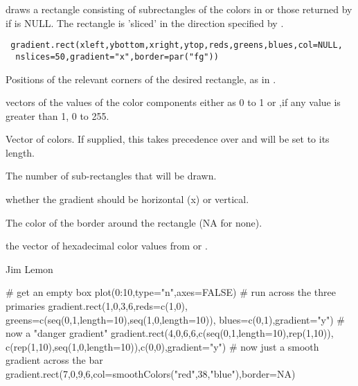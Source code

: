 \begin{Description}\relax
{} draws a rectangle consisting of 
subrectangles of the colors in  or those returned by 
 if  is NULL. The rectangle is
'sliced' in the direction specified by .
\end{Description}
\begin{Usage}
\begin{verbatim}
 gradient.rect(xleft,ybottom,xright,ytop,reds,greens,blues,col=NULL,
  nslices=50,gradient="x",border=par("fg"))
\end{verbatim}
\end{Usage}
\begin{Arguments}
\begin{ldescription}
\item[\code{xleft,ybottom,xright,ytop}] Positions of the relevant corners
of the desired rectangle, as in .
\item[\code{reds,greens,blues}] vectors of the values of the color components
either as 0 to 1 or ,if any value is greater than 1, 0 to 255.
\item[\code{col}] Vector of colors. If supplied, this takes precedence over
 and  will be set to its length.
\item[\code{nslices}] The number of sub-rectangles that will be drawn.
\item[\code{gradient}] whether the gradient should be horizontal (x) or vertical.
\item[\code{border}] The color of the border around the rectangle (NA for none).
\end{ldescription}
\end{Arguments}
\begin{Value}
the vector of hexadecimal color values from  or
.
\end{Value}
\begin{Author}\relax
Jim Lemon
\end{Author}
\begin{Examples}
\begin{ExampleCode}
 # get an empty box
 plot(0:10,type="n",axes=FALSE)
 # run across the three primaries
 gradient.rect(1,0,3,6,reds=c(1,0),
  greens=c(seq(0,1,length=10),seq(1,0,length=10)),
  blues=c(0,1),gradient="y")
 # now a "danger gradient"
 gradient.rect(4,0,6,6,c(seq(0,1,length=10),rep(1,10)),
  c(rep(1,10),seq(1,0,length=10)),c(0,0),gradient="y")
 # now just a smooth gradient across the bar
 gradient.rect(7,0,9,6,col=smoothColors("red",38,"blue"),border=NA)
\end{ExampleCode}
\end{Examples}

